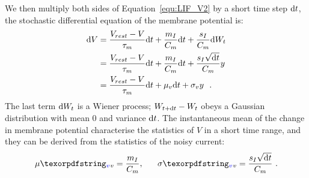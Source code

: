 	We then multiply both sides of Equation~\ref{equ:LIF_V2} by a short time step $\mathrm{d} t$, the stochastic differential equation of the membrane potential is: %
	\begin{equation}
	\DIFdelbegin %
\DIFdelend \DIFaddbegin \begin{aligned}
	\D V&= \frac{V_{rest} - V}{\tau_m }\D t + \frac{m_I}{C_m} \D t + \frac{s_I}{C_m}  \D W_t \\
	&=\frac{V_{rest} - V}{\tau_m }\D t + \frac{m_I}{C_m} \D t + \frac{s_I \sqrt{\D t}}{C_m} y  \\
	&=\frac{V_{rest} - V}{\tau_m }\D t + \mu_v \D t + \sigma_v y ~~. 
	\end{aligned}
	\DIFaddend \end{equation}	
	The last term $\mathrm{d} W_t$ is a Wiener process; $W_{t +\mathrm{d} t} - W_{t}$ obeys a Gaussian distribution with mean 0 and variance $\mathrm{d} t$\DIFaddbegin {}\DIFaddend .
	The instantaneous mean \DIFdelbegin {}\DIFdelend \DIFaddbegin {}\DIFaddend of the change in membrane potential characterise the statistics of $V$ in a short time range, and they can be derived from the statistics of the noisy current:
	\begin{equation}
	\mu\DIFaddbegin \DIFadd{_v }\DIFaddend =\dfrac{m_I}{C_m}, ~~~~~ \sigma\DIFaddbegin \DIFadd{_v }\DIFaddend = \dfrac{s_I \sqrt{\D t}}{C_m}~.
	\end{equation}
